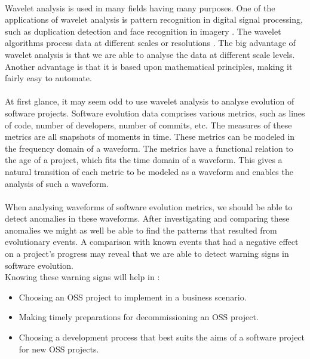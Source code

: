 \paragraph{}
Wavelet analysis is used in many fields having many purposes. One of the
applications of wavelet analysis is pattern recognition in digital signal
processing, such as duplication detection and face recognition in imagery
\cite{myna, wadkar}. The wavelet algorithms process data at different scales or
resolutions \cite{graps}. The big advantage of wavelet analysis is that we are
able to analyse the data at different scale levels. Another advantage is that it
is based upon mathematical principles, making it fairly easy to automate.

\paragraph{}
At first glance, it may seem odd to use wavelet analysis to analyse evolution of
software projects. Software evolution data comprises various metrics, such as
lines of code, number of developers, number of commits, etc. The measures of
these metrics are all snapshots of moments in time. These metrics can be
modeled in the frequency domain of a waveform. The metrics have a functional
relation to the age of a project, which fits the time domain of a waveform.
This gives a natural transition of each metric to be modeled as a waveform and
enables the analysis of such a waveform.

\paragraph{}
When analysing waveforms of software evolution metrics, we should be able to
detect anomalies in these waveforms. After investigating and comparing these
anomalies we might as well be able to find the patterns that resulted from
evolutionary events. A comparison with known events that had a negative effect
on a project's progress may reveal that we are able to detect warning signs in
software evolution.\\

\noindent
Knowing these warning signs will help in \cite{karus2013}:
\begin{itemize}
	\item Choosing an OSS project to implement in a business scenario.
	\item Making timely preparations for decommissioning an OSS project.
	\item Choosing a development process that best suits the aims of a software
	project for new OSS projects.
\end{itemize}

